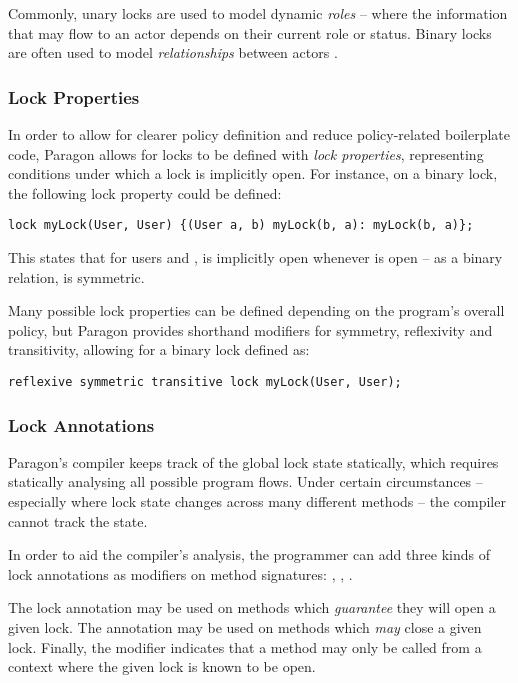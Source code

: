 Commonly, unary locks are used to model dynamic \textit{roles} -- where the information that may flow to an actor depends on their current role or status. Binary locks are often used to model \textit{relationships} between actors \cite{broberg2013paragon}.

\subsubsection{Lock Properties}

In order to allow for clearer policy definition and reduce policy-related boilerplate code, Paragon allows for locks to be defined with \textit{lock properties}, representing conditions under which a lock is implicitly open. For instance, on a binary lock, the following lock property could be defined:

\begin{verbatim}
lock myLock(User, User) {(User a, b) myLock(b, a): myLock(b, a)};
\end{verbatim}

This states that for users  and ,  is implicitly open whenever  is open -- as a binary relation,  is symmetric.

Many possible lock properties can be defined depending on the program's overall policy, but Paragon provides shorthand modifiers for symmetry, reflexivity and transitivity, allowing for a binary lock defined as:

\begin{verbatim}
reflexive symmetric transitive lock myLock(User, User);
\end{verbatim}

\subsubsection{Lock Annotations}

Paragon's compiler keeps track of the global lock state statically, which requires statically analysing all possible program flows. Under certain circumstances -- especially where lock state changes across many different methods -- the compiler cannot track the state.

In order to aid the compiler's analysis, the programmer can add three kinds of lock annotations as modifiers on method signatures: , , .


The \code{+} lock annotation may be used on methods which \textit{guarantee} they will open a given lock. The \code{-} annotation may be used on methods which \textit{may} close a given lock. Finally, the \code{~} modifier indicates that a method may only be called from a context where the given lock is known to be open.

